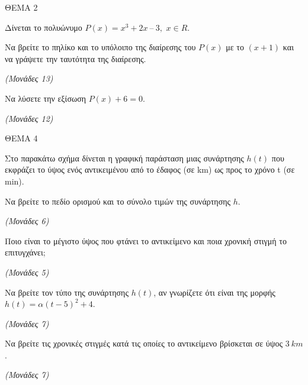 \documentclass[11pt,a4paper,twoside]{book}
\newcommand{\monades}[1]{\hfill \textit{(Μονάδες #1)}}
\begin{document}
\vspace{4mm}

ΘΕΜΑ 2

Δίνεται το πολυώνυμο $P(x) = x^{3} + 2x\ –\ 3,$ $x \in R$.

\begin{alist}
\item Να βρείτε το πηλίκο και το υπόλοιπο της διαίρεσης του $P(x)$ με το $(x + 1)$ και να γράψετε την ταυτότητα της διαίρεσης.

\monades{13}

\item Να λύσετε την εξίσωση $P(x) + 6 = 0$.

\monades{12}
\end{alist}

\vspace{4mm}

ΘΕΜΑ 4

Στο παρακάτω σχήμα δίνεται η γραφική παράσταση μιας συνάρτησης $h(t)$ που εκφράζει το ύψος ενός αντικειμένου από το έδαφος (σε km) ως προς το χρόνο t (σε min).

\begin{center}
\end{center}

\begin{alist}
\item Να βρείτε το πεδίο ορισμού και το σύνολο τιμών της συνάρτησης $h$.

\monades{6}

\item Ποιο είναι το μέγιστο ύψος που φτάνει το αντικείμενο και ποια χρονική στιγμή το επιτυγχάνει;

\monades{5}

\item Να βρείτε τον τύπο της συνάρτησης $h(t)$, αν γνωρίζετε ότι είναι της μορφής $h(t) = \alpha(t-5)^2 + 4$.

\monades{7}

\item Να βρείτε τις χρονικές στιγμές κατά τις οποίες το αντικείμενο βρίσκεται σε ύψος $3\ km$.

\monades{7}
\end{alist}
\end{document}
